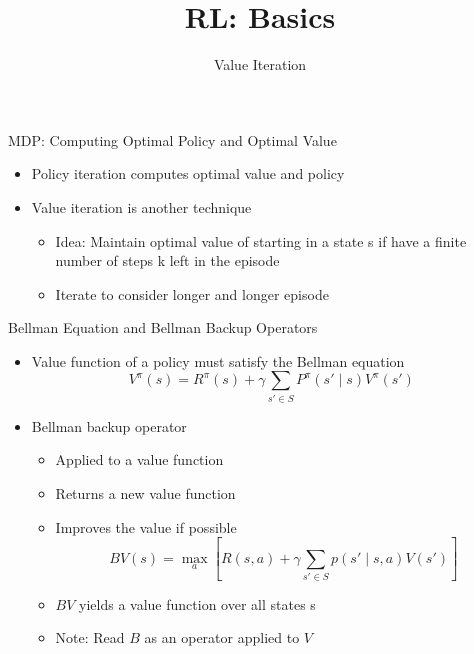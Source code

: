 


\title[Reinforcement Learning: Basics]{RL: Basics}
\subtitle{Value Iteration}




	
	\maketitle

\begin{frame}[c]{MDP: Computing Optimal Policy and Optimal Value}

\begin{itemize}
	\item Policy iteration computes optimal value and policy
	\item Value iteration is another technique
	\begin{itemize}
		\item Idea: Maintain optimal value of starting in a state s if have a finite 	number of steps k left in the episode
		\item Iterate to consider longer and longer episode
	\end{itemize}

\end{itemize}

\end{frame}
\begin{frame}[c]{Bellman Equation and Bellman Backup Operators}

\begin{itemize}
	\item Value function of a policy must satisfy the Bellman equation
	$$V^\pi (s) = R^\pi (s) + \gamma \sum_{s' \in S}  P^\pi(s' \mid s ) V^\pi (s') $$
	\item Bellman backup operator
	\begin{itemize}
		\item Applied to a value function
		 \item 	Returns a new value function
		 \item 	Improves the value if possible
		 $$ BV(s) = \max_{a} [ R(s,a) + \gamma \sum_{s' \in S} p(s' \mid s,a)  V(s')  ]$$
		 \item $BV$ yields a value function over all states s
		 \item Note: Read $B$ as an operator applied to $V$
	\end{itemize}
	
\end{itemize}

\end{frame}
